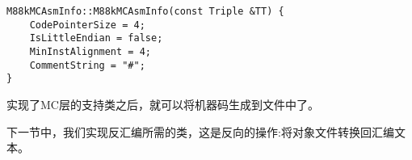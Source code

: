 \begin{lstlisting}[caption={}]
M88kMCAsmInfo::M88kMCAsmInfo(const Triple &TT) {
	CodePointerSize = 4;
	IsLittleEndian = false;
	MinInstAlignment = 4;
	CommentString = "#";
}
\end{lstlisting}

实现了MC层的支持类之后，就可以将机器码生成到文件中了。\par

下一节中，我们实现反汇编所需的类，这是反向的操作:将对象文件转换回汇编文本。\par
























